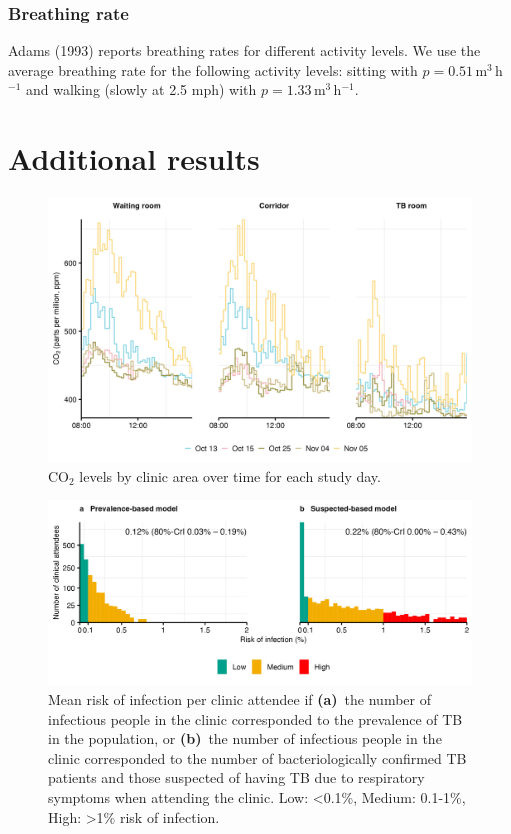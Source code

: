 \documentclass[fleqn,11pt]{wlscirep_supp}
\begin{document}
\subsubsection{Breathing rate}

Adams (1993)\cite{Adams1993} reports breathing rates for different activity levels. We use the average breathing rate for the following activity levels: sitting with $p = 0.51$\,m$^3$\,h$^{-1}$ and walking (slowly at 2.5 mph) with $p = 1.33$\,m$^3$\,h$^{-1}$. 

\clearpage

\section{Additional results}\label{sec:additional-results}

\begin{figure}[!htpb]
    \centering
    \includegraphics{results/data/co2-levels-over-time.png}
    \caption{CO$_2$ levels by clinic area over time for each study day.}
    \label{fig:co2-levels}
\end{figure}

\begin{figure}[!htpb]
    \centering
    \includegraphics{results/modeling/mean-roi-assumptions.png}
    \caption[Mean risk of infection per clinic attendee when varying assumptions about the number of infectious people in the clinic]{Mean risk of infection per clinic attendee if \textbf{(a)}~the number of infectious people in the clinic corresponded to the prevalence of TB in the population, or \textbf{(b)}~the number of infectious people in the clinic corresponded to the number of bacteriologically confirmed TB patients and those suspected of having TB due to respiratory symptoms when attending the clinic. Low: <0.1\%, Medium: 0.1-1\%, High: >1\% risk of infection.}
    \label{fig:assumptions-results}
\end{figure}
\end{document}
